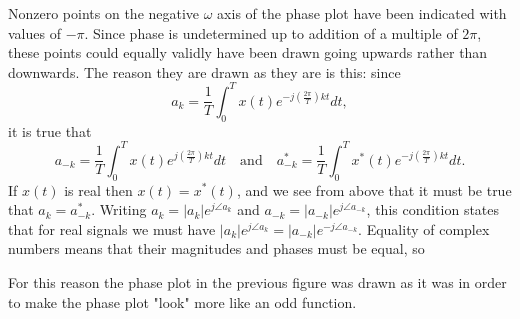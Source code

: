 \documentclass[10pt]{beamer}
\begin{document}
Nonzero points on the negative $\omega$ axis of the phase plot have been indicated with values of $-\pi$.  Since phase is undetermined up to addition of a multiple of $2 \pi$, these points could equally validly have been drawn going upwards rather than downwards.  The reason they are drawn as they are is this:  since
\begin{equation*}
  a_k = \frac{1}{T} \int_{0}^{T} x(t) e^{-j \left( \frac{2 \pi}{T} \right) k t} dt,
\end{equation*}
it is true that
\begin{equation*}
  a_{-k} = \frac{1}{T} \int_{0}^{T} x(t) e^{j \left( \frac{2 \pi}{T} \right) k t} dt
  \quad \text{and} \quad 
  a_{-k}^\ast = \frac{1}{T} \int_{0}^{T} x^\ast(t) e^{-j \left( \frac{2 \pi}{T} \right) k t} dt.
\end{equation*}
If $x(t)$ is real then $x(t) = x^\ast(t)$, and we see from above that it must be true that $a_k = a_{-k}^\ast$.  Writing $a_k = |a_k| e^{j \angle a_k}$ and $a_{-k} = |a_{-k}| e^{j \angle a_{-k}}$, this condition states that for real signals we must have $|a_k| e^{j \angle a_k} = |a_{-k}| e^{-j \angle a_{-k}}$.  Equality of complex numbers means that their magnitudes and phases must be equal, so 
\begin{center}
\end{center}
For this reason the phase plot in the previous figure was drawn as it was in order to make the phase plot "look" more like an odd function.
\end{document}
